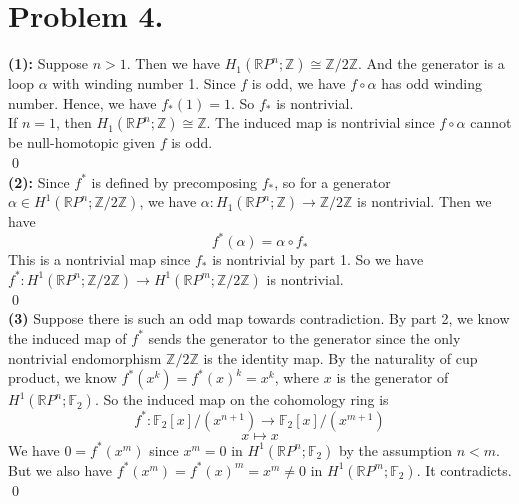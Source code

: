 \documentclass[12pt]{amsart}
\newcommand{\R}{\mathbb{R}}
\newcommand{\Z}{\mathbb{Z}}
\newcommand{\F}{\mathbb{F}}
\begin{document}
\section*{Problem 4.}
\textbf{(1): }Suppose $n>1$. Then we have $H_1(\R P^n;\Z)\cong \Z/2\Z$. And the generator is a loop $\alpha$ with winding number 1. Since $f$ is odd, we have $f\circ \alpha$ has odd winding number. Hence, we have $f_\ast(1)=1$. So $f_\ast$ is nontrivial.\\
If $n=1$, then $H_1(\R P^n;\Z)\cong  \Z$. The induced map is nontrivial since $f\circ \alpha$ cannot be null-homotopic given $f$ is odd.\\\qed\\
\textbf{(2):} Since $f^\ast$ is defined by precomposing $f_\ast$, so for a generator $\alpha\in H^1(\R P^n;\Z/2\Z)$, we have $\alpha: H_1(\R P^n;\Z )\to \Z/2\Z$ is nontrivial. Then we have
\[f^\ast(\alpha)=\alpha\circ f_\ast\]
This is a nontrivial map since $f_\ast$ is nontrivial by part 1. So we have $f^\ast: H^1(\R P^n;\Z/2\Z)\to H^1(\R P^m;\Z/2\Z)$ is nontrivial.
\\\qed\\
\textbf{(3)} Suppose there is such an odd map towards contradiction. By part 2, we know the induced map of $f^\ast$ sends the generator to the generator since the only nontrivial endomorphism $\Z/2\Z$ is the identity map. By the naturality of cup product, we know $f^\ast(x^k)=f^\ast(x)^k=x^k$, where $x$ is the generator of $H^1(\R P^n;\F_2)$. So the induced map on the cohomology ring is
\[f^\ast: \F_2[x]/(x^{n+1})\to \F_2[x]/(x^{m+1})\]
\[x\mapsto x\]
We have $0=f^\ast(x^m)$ since $x^m=0$ in $H^1(\R P^n;\F_2)$ by the assumption $n<m$. But we also have $f^\ast(x^m)=f^\ast(x)^m=x^m\neq 0$ in $H^1(\R P^m;\F_2)$. It contradicts.
\\\qed\\ 
\end{document}
